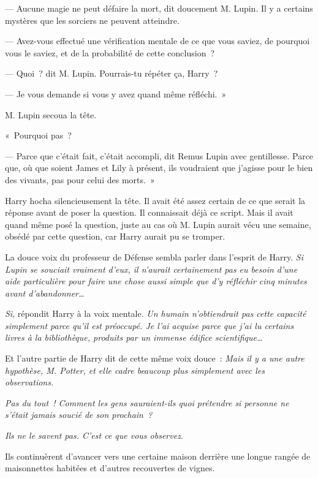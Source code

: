 --- Aucune magie ne peut défaire la mort, dit doucement M. Lupin.
Il y a certains mystères que les sorciers ne peuvent atteindre.

--- Avez-vous effectué une vérification mentale de ce que vous saviez, de pourquoi vous le saviez, et de la probabilité de cette conclusion~?

--- Quoi~? dit M. Lupin.
Pourrais-tu répéter ça, Harry~?

--- Je vous demande si vous y avez quand même réfléchi.~»

M. Lupin secoua la tête.

«~Pourquoi pas~?

--- Parce que c'était fait, c'était accompli, dit Remus Lupin avec gentillesse.
Parce que, où que soient James et Lily à présent, ils voudraient que j'agisse pour le bien des vivants, pas pour celui des morts.~»

Harry hocha silencieusement la tête.
Il avait été assez certain de ce que serait la réponse avant de poser la question.
Il connaissait déjà ce script.
Mais il avait quand même posé la question, juste au cas où M. Lupin aurait vécu une semaine, obsédé par cette question, car Harry aurait pu se tromper.

La douce voix du professeur de Défense sembla parler dans l'esprit de Harry.
\emph{Si Lupin se souciait vraiment d'eux, il n'aurait certainement pas eu besoin d'une aide particulière pour faire une chose aussi simple que d'y réfléchir cinq minutes avant d'abandonner…}

\emph{Si}, répondit Harry à la voix mentale.
\emph{Un humain n'obtiendrait pas cette capacité simplement parce qu'il est préoccupé.
Je l'ai acquise parce que j'ai lu certains livres à la bibliothèque, produits par un immense édifice scientifique…}

Et l'autre partie de Harry dit de cette même voix douce~: \emph{Mais il y a une autre hypothèse, M. Potter, et elle cadre beaucoup plus simplement avec les observations.}

\emph{Pas du tout~!
Comment les gens sauraient-ils quoi prétendre si personne ne s'était jamais soucié de son prochain~?}

\emph{Ils ne le savent pas.
C'est ce que vous observez.}

Ils continuèrent d'avancer vers une certaine maison derrière une longue rangée de maisonnettes habitées et d'autres recouvertes de vignes.

